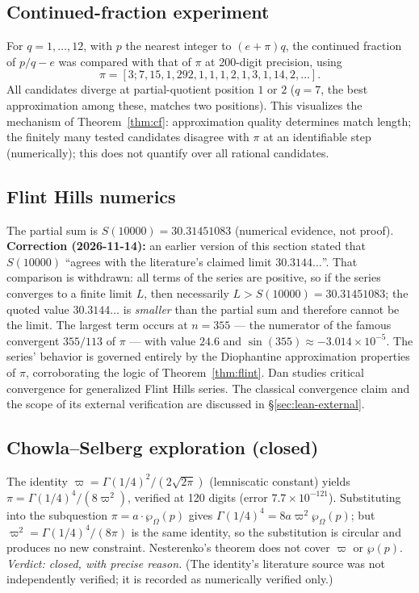 \documentclass[11pt]{amsart}
\theoremstyle{definition}
\theoremstyle{remark}
\numberwithin{equation}{section}
\begin{document}
\subsection{Continued-fraction experiment}

For $q=1,\dots,12$, with $p$ the nearest integer to $(e+\pi)q$, the continued fraction of $p/q-e$ was compared with that of $\pi$ at 200-digit precision, using
\[
\pi=[3;7,15,1,292,1,1,1,2,1,3,1,14,2,\dots].
\] All candidates diverge at partial-quotient position $1$ or $2$ ($q=7$, the best approximation among these, matches two positions). This visualizes the mechanism of Theorem~\ref{thm:cf}: approximation quality determines match length; the finitely many tested candidates disagree with $\pi$ at an identifiable step (numerically); this does not quantify over all rational candidates.

\subsection{Flint Hills numerics}

The partial sum is $S(10000)=30.31451083$ (numerical evidence, not proof). \textbf{Correction (2026-11-14):} an earlier version of this section stated that $S(10000)$ ``agrees with the literature's claimed limit $30.3144\dots$''. That comparison is withdrawn: all terms of the series are positive, so if the series converges to a finite limit $L$, then necessarily $L>S(10000)=30.31451083$; the quoted value $30.3144\dots$ is \emph{smaller} than the partial sum and therefore cannot be the limit. The largest term occurs at $n=355$ --- the numerator of the famous convergent $355/113$ of $\pi$ --- with value $24.6$ and $\sin(355)\approx-3.014\times10^{-5}$. The series' behavior is governed entirely by the Diophantine approximation properties of $\pi$, corroborating the logic of Theorem~\ref{thm:flint}. Dan \cite{Dan2026} studies critical convergence for generalized Flint Hills series. The classical convergence claim and the scope of its external verification are discussed in \S\ref{sec:lean-external}.

\subsection{Chowla--Selberg exploration (closed)}

The identity $\varpi=\Gamma(1/4)^2/(2\sqrt{2\pi})$ (lemniscatic constant) yields $\pi=\Gamma(1/4)^4/(8\varpi^2)$, verified at 120 digits (error $7.7\times10^{-121}$). Substituting into the subquestion $\pi=a\cdot\wp_\Omega(p)$ gives $\Gamma(1/4)^4=8a\varpi^2\wp_\Omega(p)$; but $\varpi^2=\Gamma(1/4)^4/(8\pi)$ is the same identity, so the substitution is circular and produces no new constraint. Nesterenko's theorem does not cover $\varpi$ or $\wp(p)$. \emph{Verdict: closed, with precise reason.} (The identity's literature source was not independently verified; it is recorded as numerically verified only.)
\end{document}

